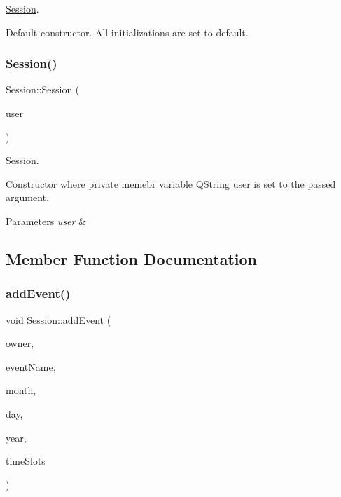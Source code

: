 \hyperlink{class_session}{Session}. 

Default constructor. All initializations are set to default. \mbox{\label{class_session_a0a7362dd58b94a67af892eb2cda1082a}} 
\subsubsection{\texorpdfstring{Session()}{Session()}\hspace{0.1cm}{\footnotesize\ttfamily [2/2]}}
{\footnotesize\ttfamily Session\+::\+Session (\begin{DoxyParamCaption}\item[{Q\+String}]{user }\end{DoxyParamCaption})}



\hyperlink{class_session}{Session}. 

Constructor where private memebr variable Q\+String user is set to the passed argument. 
\begin{DoxyParams}{Parameters}
{\em user} & \\
\hline
\end{DoxyParams}


\subsection{Member Function Documentation}
\mbox{\label{class_session_aaeaa643e010cc10517063cd031412ec4}} 
\subsubsection{\texorpdfstring{add\+Event()}{addEvent()}}
{\footnotesize\ttfamily void Session\+::add\+Event (\begin{DoxyParamCaption}\item[{Q\+String}]{owner,  }\item[{Q\+String}]{event\+Name,  }\item[{int}]{month,  }\item[{int}]{day,  }\item[{int}]{year,  }\item[{Q\+List$<$ \hyperlink{class_time_slot}{Time\+Slot} $>$}]{time\+Slots }\end{DoxyParamCaption})}



